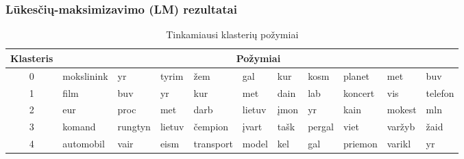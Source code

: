 \documentclass{VUMIFInfKursinis}
\begin{document}
\subsubsection{Lūkesčių-maksimizavimo (LM)
rezultatai}

\begin{table}[!h]
	\footnotesize
	\caption{Tinkamiausi klasterių požymiai}

	\begin{tabular}{|c|l|l|l|l|l|l|l|l|l|l|}
	\hline
	Klasteris & \multicolumn{10}{c|}{Požymiai} \\ \hline
	0 & mokslinink & yr & tyrim & žem & gal & kur & kosm & planet & met &
	buv\\ \hline
	1 & film & buv & yr & kur & met & dain & lab & koncert & vis &
	telefon\\ \hline
	2 & eur & proc & met & darb & lietuv & įmon & yr & kain & mokest &
	mln\\ \hline
	3 & komand & rungtyn & lietuv & čempion & įvart & tašk & pergal & viet &
	varžyb & žaid\\ \hline
	4 & automobil & vair & eism & transport & model & kel & gal & priemon &
	varikl & yr\\ \hline
	\end{tabular}
\end{table}
\end{document}

